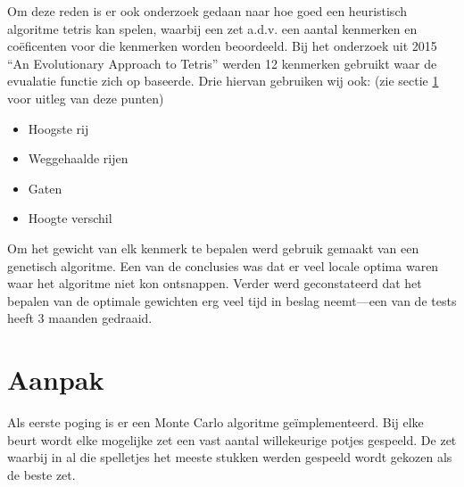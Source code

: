 \documentclass[10pt]{article}
\begin{document}
Om deze reden is er ook onderzoek gedaan naar hoe goed een heuristisch algoritme tetris kan spelen, waarbij een zet a.d.v. een aantal kenmerken en co\"{e}ficenten voor die kenmerken worden beoordeeld. Bij het onderzoek uit 2015 ``An Evolutionary Approach to Tetris'' \cite{genetic} werden 12 kenmerken gebruikt waar de evualatie functie zich op baseerde. Drie hiervan gebruiken wij ook: (zie sectie \ref{aanpak} voor uitleg van deze punten)
\begin{itemize}
\item Hoogste rij
\item Weggehaalde rijen
\item Gaten
\item Hoogte verschil
\end{itemize}

Om het gewicht van elk kenmerk te bepalen werd gebruik gemaakt van een genetisch algoritme. Een van de conclusies was dat er veel locale optima waren waar het algoritme niet kon ontsnappen. Verder werd geconstateerd dat het bepalen van de optimale gewichten erg veel tijd in beslag neemt---een van de tests heeft 3 maanden gedraaid.


\section{Aanpak}\label{aanpak}
Als eerste poging is er een Monte Carlo algoritme ge\"{i}mplementeerd. Bij elke beurt wordt elke mogelijke zet een vast aantal willekeurige potjes gespeeld. De zet waarbij in al die spelletjes het meeste stukken werden gespeeld wordt gekozen als de beste zet.
\end{document}
